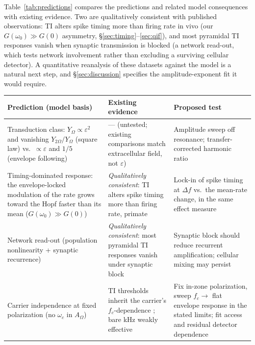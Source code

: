 \documentclass[11pt,a4paper]{article}
\begin{document}
Table~\ref{tab:predictions} compares the predictions and related model consequences
with existing evidence.
Two are qualitatively consistent with published observations: TI alters spike timing
more than firing rate in vivo \cite{vieira2024} (our $G(\omega_0)\!\gg\!G(0)$ asymmetry,
\S\ref{sec:timing}--\ref{sec:qif}), and most pyramidal TI responses vanish when synaptic
transmission is blocked \cite{caldas2024} (a network read-out, which tests network
involvement rather than excluding a surviving cellular detector). A
quantitative reanalysis of these datasets against the model is a natural next step, and
\S\ref{sec:discussion} specifies the amplitude-exponent fit it would require.

\begin{table}[h]
\centering\small
\renewcommand{\arraystretch}{1.25}
\begin{tabular}{@{}>{\raggedright\arraybackslash}p{} >{\raggedright\arraybackslash}p{} >{\raggedright\arraybackslash}p{}@{}}
\toprule
\textbf{Prediction (model basis)} & \textbf{Existing evidence} & \textbf{Proposed test} \\
\midrule
Transduction class: $Y_\Omega\propto\varepsilon^2$ and vanishing $Y_{2\Omega}/Y_\Omega$
(square law) vs.\ $\propto\varepsilon$ and $1/5$ (envelope following) & --- (untested;
existing comparisons match extracellular field, not $\varepsilon$) & Amplitude sweep off
resonance; transfer-corrected harmonic ratio \\
Timing-dominated response: the envelope-locked modulation of the rate grows toward
the Hopf faster than its mean ($G(\omega_0)\!\gg\!G(0)$) & \emph{Qualitatively
consistent}: TI alters spike timing more than firing rate, primate \cite{vieira2024} &
Lock-in of spike timing at $\Delta f$ vs.\ the mean-rate change, in the same effect
measure \\
Network read-out (population nonlinearity + synaptic recurrence) &
\emph{Qualitatively consistent}: most pyramidal TI responses vanish under synaptic block
\cite{caldas2024} & Synaptic block should reduce recurrent amplification; cellular
mixing may persist \\
Carrier independence at fixed polarization (no $\omega_c$ in $A_\Omega$) & TI thresholds
inherit the carrier's $f_c$-dependence \cite{opancar2025,peripheral2023}; bare kHz weakly
effective \cite{esmaeilpour2020} & Fix in-zone polarization, sweep $f_c\!\to$ flat envelope
response in the stated limits; fit access and residual detector dependence \\

\end{tabular}
\end{table}
\end{document}
